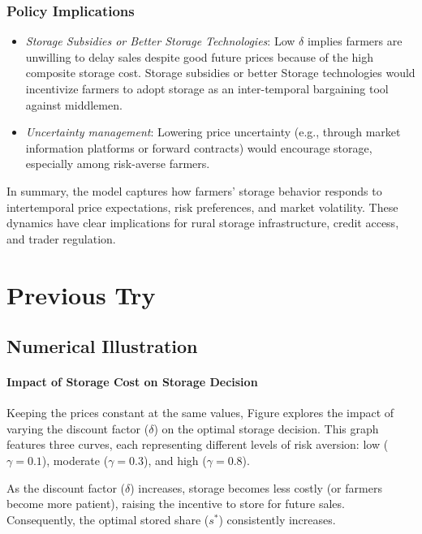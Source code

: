 \documentclass[12pt]{article}
\begin{document}
\subsubsection{Policy Implications}
\begin{itemize}
    \item \textit{Storage Subsidies or Better Storage Technologies}: Low $\delta$ implies farmers are unwilling to delay sales despite good future prices because of the high composite storage cost. Storage subsidies or better Storage technologies would incentivize farmers to adopt storage as an inter-temporal bargaining tool against middlemen.
    \item \textit{Uncertainty management}: Lowering price uncertainty (e.g., through market information platforms or forward contracts) would encourage storage, especially among risk-averse farmers.
\end{itemize}

In summary, the model captures how farmers’ storage behavior responds to intertemporal price expectations, risk preferences, and market volatility. These dynamics have clear implications for rural storage infrastructure, credit access, and trader regulation.











\newpage
\appendix
\section{Previous Try}
\subsection{Numerical Illustration}
\paragraph{Impact of Storage Cost on Storage Decision}
Keeping the prices constant at the same values, Figure explores the impact of varying the discount factor (\( \delta \)) on the optimal storage decision. This graph features three curves, each representing different levels of risk aversion: low ($\gamma=0.1$), moderate ($\gamma=0.3$), and high ($\gamma=0.8$).

As the discount factor ($\delta$) increases, storage becomes less costly (or farmers become more patient), raising the incentive to store for future sales. Consequently, the optimal stored share ($s^*$) consistently increases. 
\end{document}
